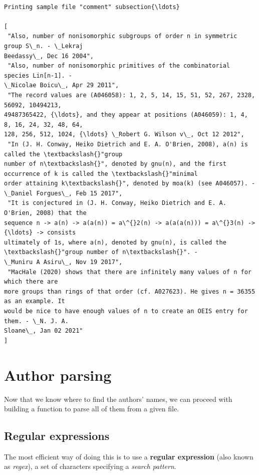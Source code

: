 \documentclass[11pt]{article}
\begin{document}
    \begin{Verbatim}[commandchars=\\\{\}]

Printing sample file "comment" subsection{\ldots}

[
 "Also, number of nonisomorphic subgroups of order n in symmetric group S\_n. - \_Lekraj
Beedassy\_, Dec 16 2004",
 "Also, number of nonisomorphic primitives of the combinatorial species Lin[n-1]. -
\_Nicolae Boicu\_, Apr 29 2011",
 "The record values are (A046058): 1, 2, 5, 14, 15, 51, 52, 267, 2328, 56092, 10494213,
49487365422, {\ldots}, and they appear at positions (A046059): 1, 4, 8, 16, 24, 32, 48, 64,
128, 256, 512, 1024, {\ldots} \_Robert G. Wilson v\_, Oct 12 2012",
 "In (J. H. Conway, Heiko Dietrich and E. A. O'Brien, 2008), a(n) is called the \textbackslash{}"group
number of n\textbackslash{}", denoted by gnu(n), and the first occurrence of k is called the \textbackslash{}"minimal
order attaining k\textbackslash{}", denoted by moa(k) (see A046057). - \_Daniel Forgues\_, Feb 15 2017",
 "It is conjectured in (J. H. Conway, Heiko Dietrich and E. A. O'Brien, 2008) that the
sequence n -> a(n) -> a(a(n)) = a\^{}2(n) -> a(a(a(n))) = a\^{}3(n) -> {\ldots} -> consists
ultimately of 1s, where a(n), denoted by gnu(n), is called the \textbackslash{}"group number of n\textbackslash{}". -
\_Muniru A Asiru\_, Nov 19 2017",
 "MacHale (2020) shows that there are infinitely many values of n for which there are
more groups than rings of that order (cf. A027623). He gives n = 36355 as an example. It
would be nice to have enough values of n to create an OEIS entry for them. - \_N. J. A.
Sloane\_, Jan 02 2021"
]
    \end{Verbatim}

\section{Author parsing}\label{author-parsing}

Now that we know where to find the authors' names, we can proceed with
building a function to parse all of them from a given file.

\hypertarget{regular-expressions}{%
\subsection{Regular expressions}\label{regular-expressions}}

The most efficient way of doing this is to use a \textbf{regular
expression} (also known as \emph{regex}), a set of characters specifying
a \emph{search pattern}.
\end{document}
